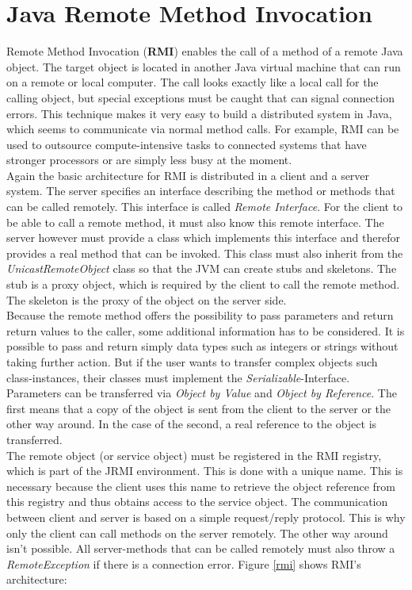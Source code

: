 \section{Java Remote Method Invocation}
Remote Method Invocation (\textbf{RMI}) enables the call of a method of a remote Java object. The target object is located in another Java virtual machine that can run on a remote or local computer. The call looks exactly like a local call for the calling object, but special exceptions must be caught that can signal connection errors. This technique makes it very easy to build a distributed system in Java, which seems to communicate via normal method calls. For example, RMI can be used to outsource compute-intensive tasks to connected systems that have stronger processors or are simply less busy at the moment. 
\\
Again the basic architecture for RMI is distributed in a client and a server system. The server specifies an interface describing the method or methods that can be called remotely. This interface is called \textit{Remote Interface}. For the client to be able to call a remote method, it must also know this remote interface. The server however must provide a class which implements this interface and therefor provides a real method that can be invoked. This class must also inherit from the \textit{UnicastRemoteObject} class so that the JVM can create stubs and skeletons. The stub is a proxy object, which is required by the client to call the remote method. The skeleton is the proxy of the object on the server side.
\\
Because the remote method offers the possibility to pass parameters and return return values to the caller, some additional information has to be considered. It is possible to pass and return simply data types such as integers or strings without taking further action. But if the user wants to transfer complex objects such class-instances, their classes must implement the \textit{Serializable}-Interface.
\\
Parameters can be transferred via \textit{Object by Value} and \textit{Object by Reference}. The first means that a copy of the object is sent from the client to the server or the other way around. In the case of the second, a real reference to the object is transferred.
\\
The remote object (or service object) must be registered in the RMI registry, which is part of the JRMI environment. This is done with a unique name. This is necessary because the client uses this name to retrieve the object reference from this registry and thus obtains access to the service object. The communication between client and server is based on a simple request/reply protocol. This is why only the client can call methods on the server remotely. The other way around isn't possible. All server-methods that can be called remotely must also throw a \textit{RemoteException} if there is a connection error. Figure \ref{rmi} shows RMI's architecture:
